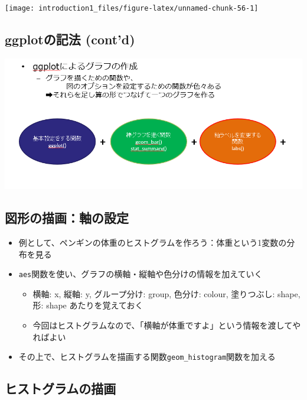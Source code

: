 \documentclass[
]{ltjsarticle}
\providecommand{\tightlist}{%
  \setlength{\itemsep}{0pt}\setlength{\parskip}{0pt}}
\begin{document}
\begin{center}\texttt{[image: introduction1\_files/figure-latex/unnamed-chunk-56-1]} \end{center}

\hypertarget{ggplotux306eux8a18ux6cd5-contd}{%
\subsection{ggplotの記法
(cont'd)}\label{ggplotux306eux8a18ux6cd5-contd}}

\begin{center}\includegraphics[width=0.8\linewidth]{figs/ggplot_fig} \end{center}

\hypertarget{ux56f3ux5f62ux306eux63cfux753bux8ef8ux306eux8a2dux5b9a}{%
\subsection{図形の描画：軸の設定}\label{ux56f3ux5f62ux306eux63cfux753bux8ef8ux306eux8a2dux5b9a}}

\begin{itemize}
\tightlist
\item
  例として、ペンギンの体重のヒストグラムを作ろう：体重という1変数の分布を見る
\item
  \texttt{aes}関数を使い、グラフの横軸・縦軸や色分けの情報を加えていく

  \begin{itemize}
  \tightlist
  \item
    横軸: x, 縦軸: y, グループ分け: group, 色分け: colour, 塗りつぶし:
    shape, 形: shape あたりを覚えておく
  \item
    今回はヒストグラムなので、「横軸が体重ですよ」という情報を渡してやればよい
  \end{itemize}
\item
  その上で、ヒストグラムを描画する関数\texttt{geom\_histogram}関数を加える
\end{itemize}

\hypertarget{ux30d2ux30b9ux30c8ux30b0ux30e9ux30e0ux306eux63cfux753b}{%
\subsection{ヒストグラムの描画}\label{ux30d2ux30b9ux30c8ux30b0ux30e9ux30e0ux306eux63cfux753b}}
\end{document}
